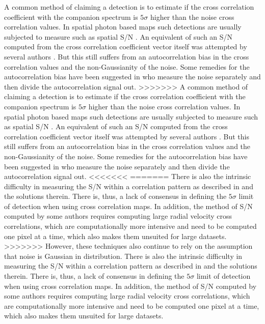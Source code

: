 \documentclass{aa}
\begin{document}
{A common method of claiming a detection is to estimate if the cross correlation coefficient with the companion spectrum is $5\sigma$ higher than the noise cross correlation values.
In spatial photon based maps such detections are usually subjected to measure such as spatial S/N \citep[][]{2014MawetSNR}.
An equivalent of such an S/N computed from the cross correlation coefficient vector itself was attempted by several authors \citep[e.g., ][]{2018AHoeijmakersMM}.
But this still suffers from an autocorrelation bias in the cross correlation values and the non-Gaussianity of the noise.
Some remedies for the autocorrelation bias have been suggested in \citet[][]{ruffio2019radial} who measure the noise separately and then divide the autocorrelation signal out.
>>>>>>>
A common method of claiming a detection is to estimate if the cross correlation coefficient with the companion spectrum is $5\sigma$ higher than the noise cross correlation values.
In spatial photon based maps such detections are usually subjected to measure such as spatial S/N \citep[][]{2014MawetSNR}.
An equivalent of such an S/N computed from the cross correlation coefficient vector itself was attempted by several authors \citep[e.g., ][]{2018AHoeijmakersMM}.
But this still suffers from an autocorrelation bias in the cross correlation values and the non-Gaussianity of the noise.
Some remedies for the autocorrelation bias have been suggested in \citet[][]{ruffio2019radial} who measure the noise separately and then divide the autocorrelation signal out.
<<<<<<<
=======
There is also the intrinsic difficulty in measuring the S/N within a correlation pattern as described in \cite{2023Malin} and the solutions therein. There is, thus, a lack of consensus in defining the $5\sigma$ limit of detection when using cross correlation maps.
In addition, the method of S/N computed by some authors \citep[e.g in][]{2021Cugno} requires computing large radial velocity cross correlations, which are computationally more intensive and need to be computed one pixel at a time, which also makes them unsuited for large datasets.
>>>>>>>
However, these techniques also continue to rely on the assumption that noise is Gaussian in distribution.
There is also the intrinsic difficulty in measuring the S/N within a correlation pattern as described in \cite{2023Malin} and the solutions therein. There is, thus, a lack of consensus in defining the $5\sigma$ limit of detection when using cross correlation maps.
In addition, the method of S/N computed by some authors \citep[e.g in][]{2021Cugno} requires computing large radial velocity cross correlations, which are computationally more intensive and need to be computed one pixel at a time, which also makes them unsuited for large datasets.
}
\end{document}
